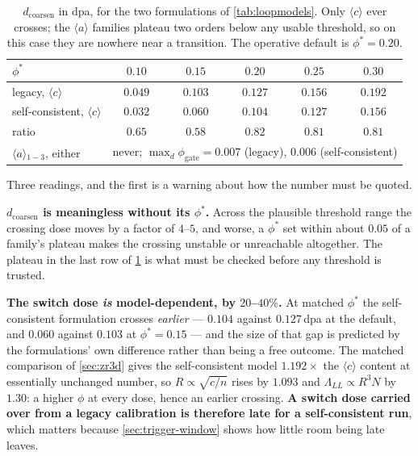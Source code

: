 \documentclass{article}
\newcommand{\aloop}{\ensuremath{\langle a\rangle}}
\newcommand{\cloop}{\ensuremath{\langle c\rangle}}
\begin{document}
\begin{table}[htbp]
\centering
\small
\caption{$d_{\mathrm{coarsen}}$ in dpa, for the two formulations of
\cref{tab:loopmodels}. Only \cloop{} ever crosses; the \aloop{} families plateau
two orders below any usable threshold, so on this case they are nowhere near a
transition. The operative default is $\phi^\ast=0.20$.}
\label{tab:dcoarsen}
\begin{tabular}{@{}lccccc@{}}
\toprule
$\phi^\ast$ & $0.10$ & $0.15$ & $0.20$ & $0.25$ & $0.30$\\
\midrule
legacy, \cloop{}          & $0.049$ & $0.103$ & $\mathbf{0.127}$ & $0.156$ & $0.192$\\
self-consistent, \cloop{} & $0.032$ & $0.060$ & $\mathbf{0.104}$ & $0.127$ & $0.156$\\
ratio                     & $0.65$ & $0.58$ & $0.82$ & $0.81$ & $0.81$\\
\midrule
\aloop{}$_{1-3}$, either  & \multicolumn{5}{c}{never;
  $\max_d\phi_{\mathrm{gate}}=0.007$ (legacy), $0.006$ (self-consistent)}\\
\bottomrule
\end{tabular}
\end{table}

Three readings, and the first is a warning about how the number must be quoted.

\textbf{$d_{\mathrm{coarsen}}$ is meaningless without its $\phi^\ast$.} Across the
plausible threshold range the crossing dose moves by a factor of $4$--$5$, and
worse, a $\phi^\ast$ set within about $0.05$ of a family's plateau makes the
crossing unstable or unreachable altogether. The plateau in the last row of
\cref{tab:dcoarsen} is what must be checked before any threshold is trusted.

\textbf{The switch dose \emph{is} model-dependent, by $20$--$40\%$.} At matched
$\phi^\ast$ the self-consistent formulation crosses \emph{earlier} --- $0.104$
against $0.127\,$dpa at the default, and $0.060$ against $0.103$ at
$\phi^\ast=0.15$ --- and the size of that gap is predicted by
the formulations' own difference rather than being a free outcome. The matched
comparison of \cref{sec:zr3d} gives the self-consistent model $1.192\times$ the
\cloop{} content at essentially unchanged number, so
$R\propto\sqrt{c/n}$ rises by $1.093$ and $\Lambda_{LL}\propto R^3N$ by $1.30$:
a higher $\phi$ at every dose, hence an earlier crossing. \textbf{A switch dose
carried over from a legacy calibration is therefore late for a self-consistent
run}, which matters because \cref{sec:trigger-window} shows how little room
being late leaves.
\end{document}
